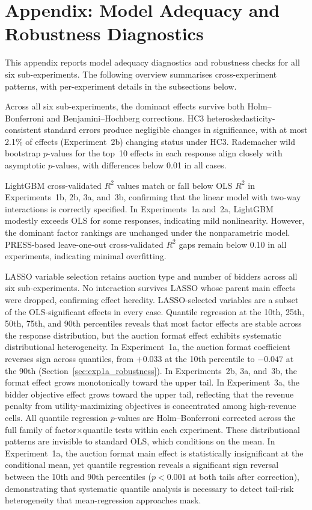 \section{Appendix: Model Adequacy and Robustness Diagnostics}
\label{sec:appendix_robustness}

This appendix reports model adequacy diagnostics and robustness checks for all six sub-experiments. The following overview summarises cross-experiment patterns, with per-experiment details in the subsections below.

Across all six sub-experiments, the dominant effects survive both Holm--Bonferroni and Benjamini--Hochberg corrections. HC3 heteroskedasticity-consistent standard errors produce negligible changes in significance, with at most 2.1\% of effects (Experiment~2b) changing status under HC3. Rademacher wild bootstrap $p$-values for the top~10 effects in each response align closely with asymptotic $p$-values, with differences below 0.01 in all cases.

LightGBM cross-validated $R^2$ values match or fall below OLS $R^2$ in Experiments~1b, 2b, 3a, and~3b, confirming that the linear model with two-way interactions is correctly specified. In Experiments~1a and~2a, LightGBM modestly exceeds OLS for some responses, indicating mild nonlinearity. However, the dominant factor rankings are unchanged under the nonparametric model. PRESS-based leave-one-out cross-validated $R^2$ gaps remain below 0.10 in all experiments, indicating minimal overfitting.

LASSO variable selection retains auction type and number of bidders across all six sub-experiments. No interaction survives LASSO whose parent main effects were dropped, confirming effect heredity. LASSO-selected variables are a subset of the OLS-significant effects in every case. Quantile regression at the 10th, 25th, 50th, 75th, and 90th percentiles reveals that most factor effects are stable across the response distribution, but the auction format effect exhibits systematic distributional heterogeneity. In Experiment~1a, the auction format coefficient reverses sign across quantiles, from $+0.033$ at the 10th percentile to $-0.047$ at the 90th (Section~\ref{sec:exp1a_robustness}). In Experiments~2b, 3a, and~3b, the format effect grows monotonically toward the upper tail. In Experiment~3a, the bidder objective effect grows toward the upper tail, reflecting that the revenue penalty from utility-maximizing objectives is concentrated among high-revenue cells. All quantile regression $p$-values are Holm--Bonferroni corrected across the full family of factor$\times$quantile tests within each experiment. These distributional patterns are invisible to standard OLS, which conditions on the mean. In Experiment~1a, the auction format main effect is statistically insignificant at the conditional mean, yet quantile regression reveals a significant sign reversal between the 10th and 90th percentiles ($p < 0.001$ at both tails after correction), demonstrating that systematic quantile analysis is necessary to detect tail-risk heterogeneity that mean-regression approaches mask.

